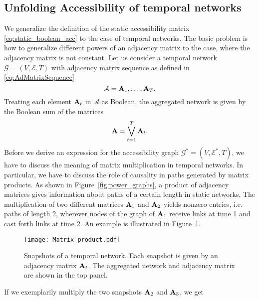 \subsection{Unfolding Accessibility of temporal networks}\label{sec:unfolding_temporal}
We generalize the definition of the static accessibility matrix \eqref{eq:static_boolean_acc} to the case of temporal networks.
The basic problem is how to generalize different powers of an adjacency matrix to the case, where the adjacency matrix is not constant.
Let us consider a temporal network $\mathcal{G}=(V,\mathcal{E},T)$ with adjacency matrix sequence as defined in \eqref{eq:AdMatrixSequence}
\begin{equation}\label{eq:AdMatrixSequence2}
\mathcal{A}=\mathbf{A}_1,\dots ,\mathbf{A}_T .
\end{equation}
Treating each element $\mathbf{A}_t$ in $\mathcal{A}$ as Boolean, the aggregated network is given by the Boolean sum of the matrices
\begin{equation}\label{eq:aggregation}
\mathbf{A}=\bigvee _{t=1} ^{T} \mathbf{A}_t .
\end{equation}
Before we derive an expression for the accessibility graph $\mathcal{G}^*=(V,\mathcal{E}^*,T)$, we have to discuss the meaning of matrix multiplication in temporal networks.
In particular, we have to discuss the role of causality in paths generated by matrix products.
As shown in Figure~\ref{fig:power_graphs}, a product of adjacency matrices gives information about paths of a certain length in static networks.
The multiplication of two different matrices $\mathbf{A}_1$ and $\mathbf{A}_2$ yields nonzero entries, i.e. paths of length 2, wherever nodes of the graph of $\mathbf{A}_1$ receive links at time 1 and cast forth links at time 2.
An example is illustrated in Figure~\ref{fig:matrix_product}.
%
\begin{figure}[htb]
\begin{center}
\texttt{[image: Matrix\_product.pdf]}
\caption{Snapshots of a temporal network.
Each snapshot is given by an adjacency matrix $\mathbf{A}_t$.
The aggregated network and adjacency matrix are shown in the top panel.}
\label{fig:matrix_product}
\end{center}
\end{figure}
%
If we exemplarily multiply the two snapshots $\mathbf{A}_2$ and $\mathbf{A}_3$, we get
